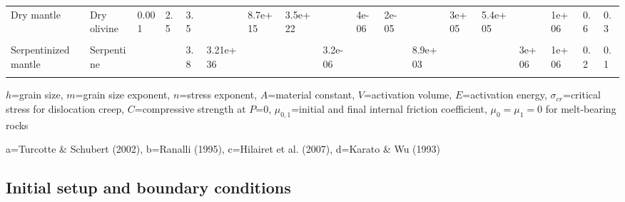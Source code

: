 \documentclass[draft,linenumbers]{agujournal2018} %
\providecommand{\DIFaddtex}[1]{{\protect\color{blue} \sf #1}} %
\providecommand{\DIFaddbegin}{} %
\providecommand{\DIFaddend}{} %
\providecommand{\DIFaddFL}[1]{\DIFadd{#1}} %
\providecommand{\DIFadd}[1]{\texorpdfstring{\DIFaddtex{#1}}{#1}} %
\newcommand{\DIFaddincludegraphics}[2][]{{\color{blue}\fbox{\DIFOincludegraphics[#1]{#2}}}} %
\DeclareRobustCommand{\DIFaddbegin}{\DIFOaddbegin \let\includegraphics\DIFaddincludegraphics} %
\DeclareRobustCommand{\DIFaddend}{\DIFOaddend \let\includegraphics\DIFOincludegraphics} %
\begin{document}
\begin{landscape}
\begin{table}
{\begin{threeparttable}
\begin{tabular}[t]{llllllllllllllllll}
Dry mantle & Dry olivine & 0.001 & 2.5 & 3.5 &  & 8.7e+15 & 3.5e+22 &  & 4e-06 & 2e-05 &  & 3e+05 & 5.4e+05 &  & 1e+06 & 0.6 & 0.3\\
\cellcolor{gray!6}{Hydrated mantle} & \cellcolor{gray!6}{Wet olivine} & \cellcolor{gray!6}{0.001} & \cellcolor{gray!6}{2.5} & \cellcolor{gray!6}{3} & \cellcolor{gray!6}{} & \cellcolor{gray!6}{5.3e+15} & \cellcolor{gray!6}{2e+18} & \cellcolor{gray!6}{} & \cellcolor{gray!6}{4e-06} & \cellcolor{gray!6}{1e-05} & \cellcolor{gray!6}{} & \cellcolor{gray!6}{2.4e+05} & \cellcolor{gray!6}{4.3e+05} & \cellcolor{gray!6}{} & \cellcolor{gray!6}{1e+06} & \cellcolor{gray!6}{0.6} & \cellcolor{gray!6}{0.3}\\
\addlinespace
Serpentinized mantle & Serpentine &  &  & 3.8 & 3.21e+36 &  &  & 3.2e-06 &  &  & 8.9e+03 &  &  & 3e+06 & 1e+06 & 0.2 & 0.1\\
\midrule
\cellcolor{gray!6}{Reference$^1$} & \cellcolor{gray!6}{b, c, d} & \cellcolor{gray!6}{d} & \cellcolor{gray!6}{d} & \cellcolor{gray!6}{b, c, d} & \cellcolor{gray!6}{b, c} & \cellcolor{gray!6}{d} & \cellcolor{gray!6}{d} & \cellcolor{gray!6}{b, c} & \cellcolor{gray!6}{d} & \cellcolor{gray!6}{d} & \cellcolor{gray!6}{b, c} & \cellcolor{gray!6}{d} & \cellcolor{gray!6}{d} & \cellcolor{gray!6}{b, c} & \cellcolor{gray!6}{a} & \cellcolor{gray!6}{} & \cellcolor{gray!6}{}\\
\bottomrule
\end{tabular}
\begin{tablenotes}
\item $h$=grain size, $m$=grain size exponent, $n$=stress exponent, $A$=material constant, $V$=activation volume, $E$=activation energy, $\sigma_{cr}$=critical stress for dislocation creep, $C$=compressive strength at $P$=0, $\mu_{0,1}$=initial and final internal friction coefficient, $\mu_0=\mu_1=0$ for melt-bearing rocks
\item[\DIFaddFL{1}] a=Turcotte \& Schubert (2002), b=Ranalli (1995), c=Hilairet et al. (2007), d=Karato \& Wu (1993)
\end{tablenotes}
\end{threeparttable}}
\end{table}
\end{landscape}
\DIFaddend

\subsection{Initial setup and boundary conditions}
\DIFaddbegin
\end{document}
